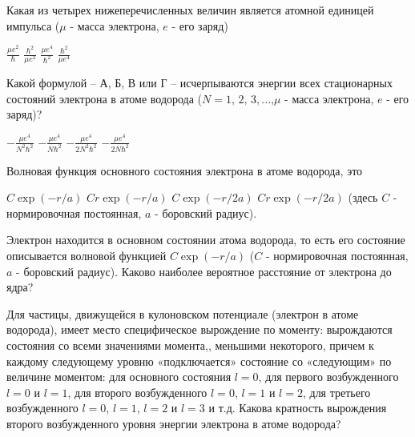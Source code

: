 \documentclass[11pt,a4paper]{exam}
\begin{document}
\begin{questions}
\question Какая из четырех нижеперечисленных величин является атомной единицей импульса ($\mu $ - масса электрона, $e$ - его заряд)
\begin{choices}
\choice $\frac{{\mu {e^2}}}{\hbar }$     
\choice $\frac{{{\hbar ^2}}}{{\mu {e^2}}}$        
\choice $\frac{{\mu {e^4}}}{{{\hbar ^2}}}$     
\choice $\frac{{{\hbar ^2}}}{{\mu {e^4}}}$
\end{choices}

\question Какой формулой – А, Б, В или Г – исчерпываются энергии всех стационарных состояний электрона в атоме водорода ($N = 1,\,2,\,3,...$,$\mu $ - масса электрона, $e$ - его заряд)?
\begin{choices}
\choice $ - \frac{{\mu {e^4}}}{{{N^2}{\hbar ^2}}}$      
\choice $ - \frac{{\mu {e^4}}}{{N{\hbar ^2}}}$    
\choice $ - \frac{{\mu {e^4}}}{{2{N^2}{\hbar ^2}}}$     
\choice $ - \frac{{\mu {e^4}}}{{2N{\hbar ^2}}}$
\end{choices}

\question Волновая функция основного состояния электрона в атоме водорода, это 
\begin{choices}
\choice $C\exp ( - r/a)$  
\choice $Cr\exp ( - r/a)$ 
\choice $C\exp ( - r/2a)$ 
\choice $Cr\exp ( - r/2a)$
(здесь $C$ - нормировочная постоянная, $a$ - боровский радиус).
\end{choices}

\question  Электрон находится в основном состоянии атома водорода, то есть его состояние описывается волновой функцией $C\exp ( - r/a)$ ($C$ - нормировочная постоянная, $a$ - боровский радиус). Каково наиболее вероятное расстояние от электрона до ядра?
\begin{choices}
\choice       
\choice       
\choice       
\choice 
\end{choices}

\question Для частицы, движущейся в кулоновском потенциале (электрон в атоме водорода), имеет место специфическое вырождение по моменту: вырождаются состояния со всеми значениями момента,, меньшими некоторого, причем к каждому следующему уровню «подключается» состояние со «следующим» по величине моментом: для основного состояния $l = 0$, для первого возбужденного $l = 0$ и $l = 1$, для второго возбужденного $l = 0$, $l = 1$ и $l = 2$, для третьего возбужденного $l = 0$, $l = 1$, $l = 2$ и $l = 3$ и т.д. Какова кратность вырождения второго возбужденного уровня энергии электрона в атоме водорода? 
\begin{choices}
\end{choices}


\end{questions}
\end{document}
